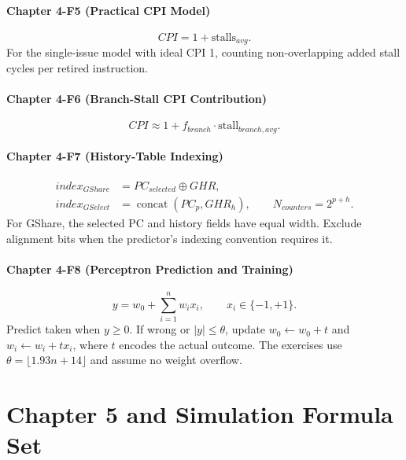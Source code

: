 \paragraph{Chapter 4-F5 (Practical CPI Model)}\label{par:auto-069}
\begin{equation}\label{eq:auto-081}
    CPI=1+\text{stalls}_{avg}.
\end{equation}
For the single-issue model with ideal CPI 1, counting non-overlapping added stall cycles per retired instruction.

\paragraph{Chapter 4-F6 (Branch-Stall CPI Contribution)}\label{par:auto-070}
\begin{equation}\label{eq:auto-082}
    CPI\approx 1+f_{branch}\cdot \text{stall}_{branch,avg}.
\end{equation}

\paragraph{Chapter 4-F7 (History-Table Indexing)}
\begin{align}
    index_{GShare}&=PC_{selected}\oplus GHR,\label{eq:app-b-gshare}\\
    index_{GSelect}&=\operatorname{concat}(PC_p,GHR_h),\qquad N_{counters}=2^{p+h}.\label{eq:app-b-gselect}
\end{align}
For GShare, the selected PC and history fields have equal width.
Exclude alignment bits when the predictor's indexing convention requires it.

\paragraph{Chapter 4-F8 (Perceptron Prediction and Training)}
\begin{equation}\label{eq:app-b-perceptron}
    y=w_0+\sum_{i=1}^{n}w_i x_i,\qquad x_i\in\{-1,+1\}.
\end{equation}
Predict taken when $y\ge0$.
If wrong or $|y|\le\theta$, update $w_0\leftarrow w_0+t$ and $w_i\leftarrow w_i+t x_i$, where $t$ encodes the actual outcome.
The exercises use $\theta=\lfloor1.93n+14\rfloor$ and assume no weight overflow.


\section*{Chapter 5 and Simulation Formula Set}\label{sec:auto-060}

